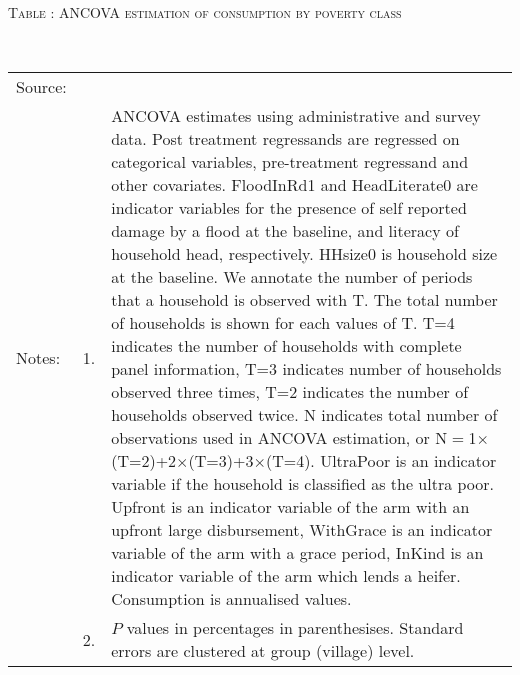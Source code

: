 \hspace{-1cm}\begin{minipage}[t]{14cm}
\hfil\textsc{\normalsize Table \thetable: ANCOVA estimation of consumption by poverty class\label{tab ANCOVA consumption2 original HH}}\\
\setlength{\tabcolsep}{1pt}
\setlength{\baselineskip}{8pt}
\renewcommand{\arraystretch}{.55}
\hfil{}\\
\renewcommand{\arraystretch}{.8}
\setlength{\tabcolsep}{1pt}
\begin{tabular}{>{\hfill\scriptsize}p{1cm}<{}>{\hfill\scriptsize}p{.25cm}<{}>{\scriptsize}p{12cm}<{\hfill}}
Source:& \multicolumn{2}{l}{\scriptsize Estimated with GUK administrative and survey data.}\\
Notes: & 1. & ANCOVA estimates using administrative and survey data. Post treatment regressands are regressed on categorical variables, pre-treatment regressand and other covariates. \textsf{FloodInRd1} and \textsf{HeadLiterate0} are indicator variables for the presence of self reported damage by a flood at the baseline, and literacy of household head, respectively. \textsf{HHsize0} is household size at the baseline. We annotate the number of periods that a household is observed with \textsf{T}. The total number of households is shown for each values of \textsf{T}. \textsf{T=4} indicates the number of households with complete panel information, \textsf{T=3} indicates number of households observed three times, \textsf{T=2} indicates the number of households observed twice. \textsf{N} indicates total number of observations used in ANCOVA estimation, or \textsf{N$=$1$\times$(T=2)+2$\times$(T=3)+3$\times$(T=4)}.  \textsf{UltraPoor} is an indicator variable if the household is classified as the ultra poor. \textsf{Upfront} is an indicator variable of the arm with an upfront large disbursement, \textsf{WithGrace} is an indicator variable of the arm with a grace period, \textsf{InKind} is an indicator variable of the arm which lends a heifer. Consumption is annualised values. \\
& 2. & $P$ values in percentages in parenthesises. Standard errors are clustered at group (village) level.
\end{tabular}
\end{minipage}


